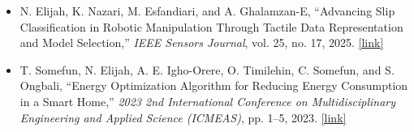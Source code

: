 \begin{itemize}
    \item N. Elijah, K. Nazari, M. Esfandiari, and A. Ghalamzan-E, ``Advancing Slip Classification in Robotic Manipulation Through Tactile Data Representation and Model Selection,'' \textit{IEEE Sensors Journal}, vol. 25, no. 17, 2025. \href{https://ieeexplore.ieee.org/document/11098591}{[link]}
    \item T. Somefun, N. Elijah, A. E. Igho-Orere, O. Timilehin, C. Somefun, and S. Ongbali, ``Energy Optimization Algorithm for Reducing Energy Consumption in a Smart Home,'' \textit{2023 2nd International Conference on Multidisciplinary Engineering and Applied Science (ICMEAS)}, pp. 1--5, 2023. \href{https://ieeexplore.ieee.org/document/10379321}{[link]}
\end{itemize}
